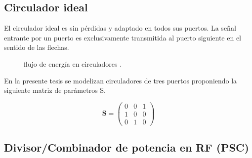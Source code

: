 \subsection{Circulador ideal}

El circulador ideal es sin pérdidas y adaptado en todos sus puertos. La señal entrante por un puerto es exclusivamente
transmitida al puerto siguiente en el sentido de las flechas.

\begin{figure}[H]
	\centering
	\caption{flujo de energía en circuladores \cite{Semiconductors1998}.}
	\label{fig:circulator}
\end{figure}

En la presente tesis se modelizan circuladores de tres puertos proponiendo la siguiente matriz de parámetros S.

$$
\mathbf{S} = \begin{pmatrix} 0 & 0 & 1\\1 & 0 & 0\\0 & 1 & 0\end{pmatrix}
$$


\subsection{Divisor/Combinador de potencia en RF (PSC)}

